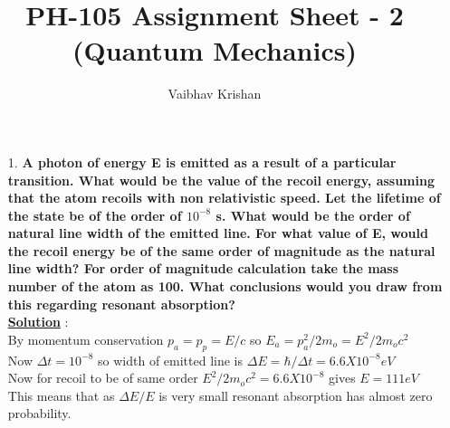 \documentclass[10pt, a4paper]{article}
\begin{document}
	\title{PH-105 Assignment Sheet - 2 (Quantum Mechanics)}
	\date{}
	\author{Vaibhav Krishan}
	\maketitle
	\newcommand{\angstrom}{\mbox{\normalfont\AA}}
	\begin{enumerate}
		\item[1.] {\bf A photon of energy E is emitted as a result of a particular transition. What would be the value of the recoil energy, assuming that the atom recoils with non relativistic speed. Let the lifetime of the state be of the order of \begin{math} 10^{-8}\end{math} s. What would be the order of natural line width of the emitted line. For what value of E, would the recoil energy be of the same order of magnitude as the natural line width? For order of magnitude calculation take the mass number of the atom as 100. What conclusions would you draw from this regarding resonant absorption?}\\
		{\underline {\bf Solution}} :\\
		By momentum conservation
		\begin{math} p_a = p_p = E/c\end{math} so \begin{math} E_a = p_a^2 / 2m_o = E^2/2m_oc^2\end{math}\\
		Now
		\begin{math} \Delta t = 10^{-8} \end{math} so width of emitted line is \begin{math} \Delta E = \hbar / \Delta t = 6.6 X 10^{-8} eV\end{math}\\
		Now for recoil to be of same order
		\begin{math} E^2 / 2m_oc^2 = 6.6 X 10^{-8}\end{math} gives \begin{math} E = 111 eV\end{math}\\
		This means that as \begin{math} \Delta E / E\end{math} is very small resonant absorption has almost zero probability.\\
	\end{enumerate}
\end{document}
